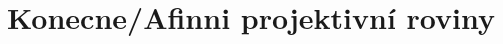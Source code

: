 \section{\texorpdfstring{Konecne/Afinni projektivní roviny}{Konecne/Afinni projektivní roviny}}
\vspace{5mm}
\large


